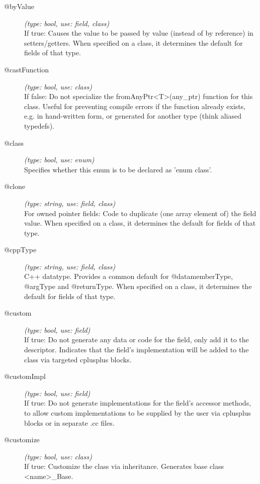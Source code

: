 \begin{description}
\item[@byValue] \textit{(type: bool, use: field, class)} \\
  If true: Causes the value to be passed by value (instead of by reference) in
  setters/getters. When specified on a class, it determines the default for
  fields of that type.

\item[@castFunction] \textit{(type: bool, use: class)} \\
  If false: Do not specialize the fromAnyPtr<T>(any\_ptr) function for this
  class. Useful for preventing compile errors if the function already exists,
  e.g. in hand-written form, or generated for another type (think aliased
  typedefs).

\item[@class] \textit{(type: bool, use: enum)} \\
  Specifies whether this enum is to be declared as 'enum class'.

\item[@clone] \textit{(type: string, use: field, class)} \\
  For owned pointer fields: Code to duplicate (one array element of) the field
  value. When specified on a class, it determines the default for fields of
  that type.

\item[@cppType] \textit{(type: string, use: field, class)} \\
  C++ datatype. Provides a common default for @datamemberType, @argType and
  @returnType. When specified on a class, it determines the default for fields
  of that type.

\item[@custom] \textit{(type: bool, use: field)} \\
  If true: Do not generate any data or code for the field, only add it to the
  descriptor. Indicates that the field's implementation will be added to the
  class via targeted cplusplus blocks.

\item[@customImpl] \textit{(type: bool, use: field)} \\
  If true: Do not generate implementations for the field's accessor methods,
  to allow custom implementations to be supplied by the user via cplusplus
  blocks or in separate .cc files.

\item[@customize] \textit{(type: bool, use: class)} \\
  If true: Customize the class via inheritance. Generates base class
  <name>\_Base.


\end{description}
